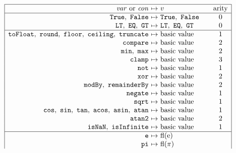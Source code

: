 \begin{figure}[htbp]
\centering
\small
\[
\begin{array}{|r@{\ }c@{\ }l@{\qquad}c|}
\hline
\var\ \text{or}\ \con & \mapsto & v & \arity\\
\hline
\kw{True}\citealso{b:Basics.Bool},\ \kw{False}\citealso{b:Basics.Bool} & \mapsto & \kw{True},\ \kw{False} & 0\\
\kw{LT}\citealso{b:Basics.Order},\ \kw{EQ}\citealso{b:Basics.Order},\ \kw{GT}\citealso{b:Basics.Order} & \mapsto & \kw{LT},\ \kw{EQ},\ \kw{GT} & 0\\
\hline
\kw{toFloat}\citealso{b:Basics.toFloat},\ \kw{round}\citealso{b:Basics.round},\ \kw{floor}\citealso{b:Basics.floor},\ \kw{ceiling}\citealso{b:Basics.ceiling},\ \kw{truncate}\citealso{b:Basics.truncate} & \mapsto & \text{basic value} & 1\\
\kw{compare}\citealso{b:Basics.compare} & \mapsto & \text{basic value} & 2\\
\kw{min}\citealso{b:Basics.min},\ \kw{max}\citealso{b:Basics.max} & \mapsto & \text{basic value} & 2\\
\kw{clamp}\citealso{b:Basics.clamp} & \mapsto & \text{basic value} & 3\\
\kw{not}\citealso{b:Basics.not} & \mapsto & \text{basic value} & 1\\
\kw{xor}\citealso{b:Basics.xor} & \mapsto & \text{basic value} & 2\\
\kw{modBy}\citealso{b:Basics.modBy},\ \kw{remainderBy}\citealso{b:Basics.remainderBy} & \mapsto & \text{basic value} & 2\\
\kw{negate}\citealso{b:Basics.negate} & \mapsto & \text{basic value} & 1\\
\kw{sqrt}\citealso{b:Basics.sqrt} & \mapsto & \text{basic value} & 1\\
\kw{cos}\citealso{b:Basics.cos},\ \kw{sin}\citealso{b:Basics.sin},\ \kw{tan}\citealso{b:Basics.tan},\ \kw{acos}\citealso{b:Basics.acos},\ \kw{asin}\citealso{b:Basics.asin},\ \kw{atan}\citealso{b:Basics.atan} & \mapsto & \text{basic value} & 1\\
\kw{atan2}\citealso{b:Basics.atan2} & \mapsto & \text{basic value} & 2\\
\kw{isNaN}\citealso{b:Basics.isNaN},\ \kw{isInfinite}\citealso{b:Basics.isInfinite} & \mapsto & \text{basic value} & 1\\
\hline
\kw{e}\citealso{b:Basics.e} & \mapsto & \dbfl(\dbeuler) & \\
\kw{pi}\citealso{b:Basics.pi} & \mapsto & \dbfl(\dbpinum) & \\

\end{array}\]
\end{figure}
